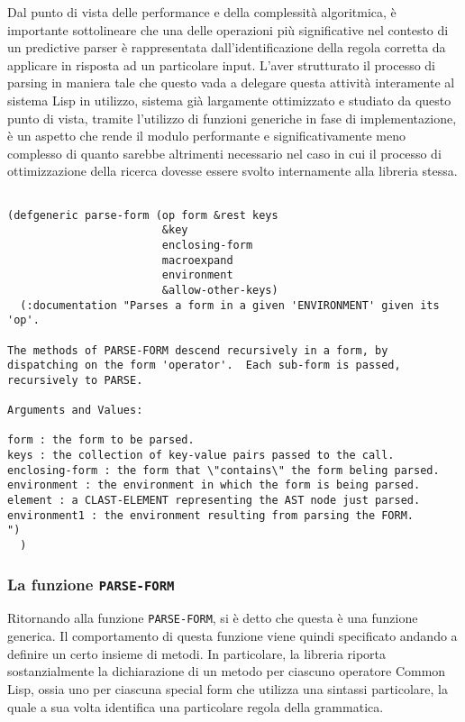 Dal punto di vista delle performance e della complessità algoritmica, è
importante sottolineare che una delle operazioni più significative nel
contesto di un predictive parser è rappresentata dall’identificazione della
regola corretta da applicare in risposta ad un particolare input. L’aver
strutturato il processo di parsing in maniera tale che questo vada a delegare
questa attività interamente al sistema Lisp in utilizzo, sistema già
largamente ottimizzato e studiato da questo punto di vista, tramite l’utilizzo
di funzioni generiche in fase di implementazione, è un aspetto che rende il
modulo performante e significativamente meno complesso di quanto sarebbe
altrimenti necessario nel caso in cui il processo di ottimizzazione della
ricerca dovesse essere svolto internamente alla libreria stessa.

\begin{lstlisting}[caption=Signature della funzione \texttt{PARSE-FORM}]

(defgeneric parse-form (op form &rest keys
                        &key
                        enclosing-form
                        macroexpand
                        environment
                        &allow-other-keys)
  (:documentation "Parses a form in a given 'ENVIRONMENT' given its 'op'.

The methods of PARSE-FORM descend recursively in a form, by
dispatching on the form 'operator'.  Each sub-form is passed,
recursively to PARSE.

Arguments and Values:

form : the form to be parsed.
keys : the collection of key-value pairs passed to the call.
enclosing-form : the form that \"contains\" the form beling parsed.
environment : the environment in which the form is being parsed.
element : a CLAST-ELEMENT representing the AST node just parsed.
environment1 : the environment resulting from parsing the FORM.
")
  )

\end{lstlisting}

\subsubsection{La funzione \texttt{PARSE-FORM}}

Ritornando alla funzione \texttt{PARSE-FORM}, si è detto che questa è una
funzione generica. Il comportamento di questa funzione viene quindi
specificato andando a definire un certo insieme di metodi. In particolare, la
libreria riporta sostanzialmente la dichiarazione di un metodo per ciascuno
operatore Common Lisp, ossia uno per ciascuna special form che utilizza una
sintassi particolare, la quale a sua volta identifica una particolare regola
della grammatica.

